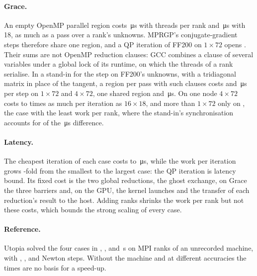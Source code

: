 \documentclass[sigconf,nonacm]{acmart}
\begin{document}
\paragraph{Grace.} An empty OpenMP parallel region costs \regionCostWide\,\si{\micro\second} with
\machineCores{} threads per rank and \regionCostNarrow\,\si{\micro\second} with 18, as much as a pass
over a rank's unknowns. MPRGP's conjugate-gradient steps therefore share one region, and a QP
iteration of FF200 on $1\times72$ opens \regionsPerIteration{}. Their sums are not OpenMP reduction
clauses: GCC combines a clause of several variables under a global lock of its runtime, on which
the threads of a rank serialise. In a stand-in for the step on FF200's unknowns, with a
tridiagonal matrix in place of the tangent, a region per pass with such clauses costs
\standinRegionsOne{} and \standinRegionsFour\,\si{\micro\second} per step on $1\times72$ and
$4\times72$, one shared region \standinTeamOne{} and \standinTeamFour\,\si{\micro\second}. On one
node $4\times72$ costs \hostThreadsMin{} to \hostThreadsMax{} times as much per iteration as
$16\times18$, and more than $1\times72$ only on \fourSlowerThanOneCases{}, the case with the least
work per rank, where the stand-in's synchronisation accounts for \standinGap{} of the
\hostGapOneFour\,\si{\micro\second} difference.

\paragraph{Latency.} The cheapest iteration of each case costs \itBestMin{} to
\itBestMax\,\si{\micro\second}, while the work per iteration grows \dofsRatio-fold from the smallest
to the largest case: the QP iteration is latency bound. Its fixed cost is the two global reductions, the
ghost exchange, on Grace the three barriers and, on the GPU, the kernel launches and the transfer of each reduction's result to
the host. Adding ranks shrinks the work per rank but not these costs, which bounds the strong
scaling of every case.

\paragraph{Reference.} Utopia solved the four cases in \utopiaTimeFPc, \utopiaTimeFFc,
\utopiaTimeFPf{} and \utopiaTimeFFf\,\si{\second} on \utopiaRanks{} MPI ranks of an unrecorded
machine, with \utopiaNewtonFPc, \utopiaNewtonFFc, \utopiaNewtonFPf{} and \utopiaNewtonFFf{} Newton
steps. Without the machine and at different accuracies the times are no basis for a speed-up.
\end{document}
